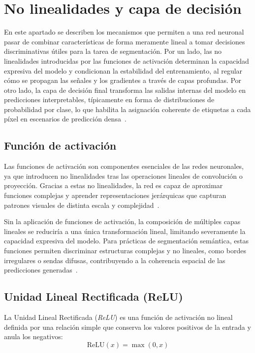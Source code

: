 \section{No linealidades y capa de decisión}
En este apartado se describen los mecanismos que permiten a una red neuronal pasar de combinar características de forma meramente lineal a tomar decisiones discriminativas útiles para la tarea de segmentación. Por un lado, las no linealidades introducidas por las funciones de activación determinan la capacidad expresiva del modelo y condicionan la estabilidad del entrenamiento, al regular cómo se propagan las señales y los gradientes a través de capas profundas. Por otro lado, la capa de decisión final transforma las salidas internas del modelo en predicciones interpretables, típicamente en forma de distribuciones de probabilidad por clase, lo que habilita la asignación coherente de etiquetas a cada píxel en escenarios de predicción densa~\cite{Goodfellow-et-al-2016}.

\subsection{Función de activación}
Las funciones de activación son componentes esenciales de las redes neuronales, ya que introducen no linealidades tras las operaciones lineales de convolución o proyección. Gracias a estas no linealidades, la red es capaz de aproximar funciones complejas y aprender representaciones jerárquicas que capturan patrones visuales de distinta escala y complejidad~\cite{Goodfellow-et-al-2016}.

Sin la aplicación de funciones de activación, la composición de múltiples capas lineales se reduciría a una única transformación lineal, limitando severamente la capacidad expresiva del modelo. Para prácticas de segmentación semántica, estas funciones permiten discriminar estructuras complejas y no lineales, como bordes irregulares o sendas difusas, contribuyendo a la coherencia espacial de las predicciones generadas~\cite{neloy2024autoencoders}.

\subsection{Unidad Lineal Rectificada (ReLU)}
La Unidad Lineal Rectificada (\textit{ReLU}) es una función de activación no lineal definida por una relación simple que conserva los valores positivos de la entrada y anula los negativos: \begin{equation}
	\mathrm{ReLU}(x) = \max(0, x)
\end{equation}

